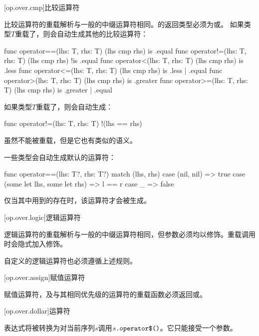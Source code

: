 [op.over.cmp]{比较运算符}

\pnum
比较运算符的重载解析与一般的中缀运算符相同。的返回类型必须为或。
如果类型$T$重载了，则会自动生成其他的比较运算符：

\begin{codeblock}
func operator==(lhs: T, rhs: T) { (lhs cmp rhs) is .equal }
func operator!=(lhs: T, rhs: T) { (lhs cmp rhs) !is .equal }
func operator<(lhs: T, rhs: T) { (lhs cmp rhs) is .less }
func operator<=(lhs: T, rhs: T) { (lhs cmp rhs) is .less | .equal }
func operator>(lhs: T, rhs: T) { (lhs cmp rhs) is .greater }
func operator>=(lhs: T, rhs: T) { (lhs cmp rhs) is .greater | .equal }
\end{codeblock}

\pnum
如果类型$T$重载了，则会自动生成：

\begin{codeblock}
func operator!=(lhs: T, rhs: T) { !(lhs == rhs) }
\end{codeblock}

\enternote 虽然不能被重载，但是它也有类似的语义。\exitnote

\pnum
一些类型会自动生成默认的运算符：

\begin{codeblock}

func operator==(lhs: T?, rhs: T?) {
    match (lhs, rhs) {
        case (nil, nil) => true
        case (some let lhs, some let rhs) => l == r
        case _ => false
    }
}

\end{codeblock}

仅当其中用到的存在时，该运算符才会被生成。

[op.over.logic]{逻辑运算符}

\pnum
逻辑运算符的重载解析与一般的中缀运算符相同，但参数必须均以修饰。重载调用时会隐式加入修饰。

\pnum
自定义的逻辑运算符也必须遵循上述规则。

[op.over.assign]{赋值运算符}

\pnum
赋值运算符，及与其相同优先级的运算符的重载函数必须返回或。

[op.over.dollar]{\tcode{\$}运算符}

\pnum
\tcode{\$}表达式将被转换为对当前序列$s$调用$s\texttt{.operator\$()}$。它只能接受一个参数。

